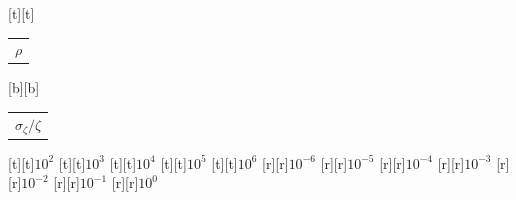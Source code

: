 %    
%
%
\begin{psfrags}%
\psfragscanon%
%
[t][t]{\color[rgb]{0,0,0}\setlength{\tabcolsep}{0pt}\begin{tabular}{c}{\Large$\rho$}\end{tabular}}%
[b][b]{\color[rgb]{0,0,0}\setlength{\tabcolsep}{0pt}\begin{tabular}{c}{\Large$\sigma_\zeta/\zeta$}\end{tabular}}%
%
[t][t]{$10^{2}$}%
[t][t]{$10^{3}$}%
[t][t]{$10^{4}$}%
[t][t]{$10^{5}$}%
[t][t]{$10^{6}$}%
%
[r][r]{$10^{-6}$}%
[r][r]{$10^{-5}$}%
[r][r]{$10^{-4}$}%
[r][r]{$10^{-3}$}%
[r][r]{$10^{-2}$}%
[r][r]{$10^{-1}$}%
[r][r]{$10^{0}$}%
%
%
\end{psfrags}%
%
